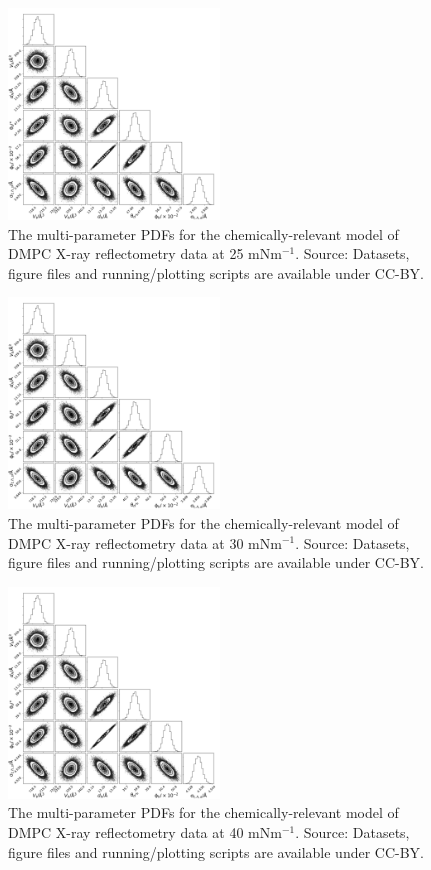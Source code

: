 \documentclass[11pt,a4paper]{paper}
\begin{document}
\begin{figure}[h]
	\centering
	\includegraphics[width=0.50\textwidth]{figures/dmpc2_all_corner}
	\caption{The multi-parameter PDFs for the chemically-relevant model of DMPC X-ray reflectometry data at 25 mNm$^{-1}$. Source: Datasets, figure files and running/plotting scripts are available under CC-BY.\cite{mccluskey_2018}}
	\label{fig:dmpc3}
\end{figure}
\begin{figure}[h]
	\centering
	\includegraphics[width=0.50\textwidth]{figures/dmpc3_all_corner}
	\caption{The multi-parameter PDFs for the chemically-relevant model of DMPC X-ray reflectometry data at 30 mNm$^{-1}$. Source: Datasets, figure files and running/plotting scripts are available under CC-BY.\cite{mccluskey_2018}}
	\label{fig:dmpc4}
\end{figure}
\begin{figure}
	\centering
	\includegraphics[width=0.50\textwidth]{figures/dmpc4_all_corner}
	\caption{The multi-parameter PDFs for the chemically-relevant model of DMPC X-ray reflectometry data at 40 mNm$^{-1}$. Source: Datasets, figure files and running/plotting scripts are available under CC-BY.\cite{mccluskey_2018}}
	\label{fig:dmpc5}
\end{figure}
\end{document}
